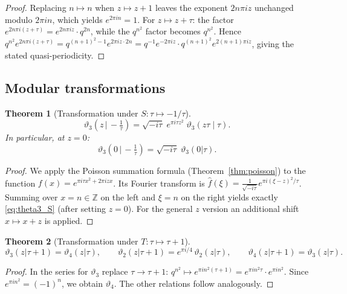 \documentclass[12pt,a4paper]{amsart}
\newtheorem{theorem}{Theorem}[section]
\theoremstyle{definition}
\begin{document}
\begin{proof}
Replacing $n \mapsto n$ when $z \mapsto z+1$ leaves the exponent $2n\pi iz$ unchanged
modulo $2\pi in$, which yields $e^{2\pi in} = 1$.
For $z \mapsto z + \tau$: the factor $e^{2n\pi i(z+\tau)} = e^{2n\pi iz}\cdot q^{2n}$,
while the $q^{n^2}$ factor becomes $q^{n^2}$.  Hence
$q^{n^2} e^{2n\pi i(z+\tau)} = q^{(n+1)^2 - 1} e^{2\pi iz \cdot 2n}
= q^{-1}e^{-2\pi iz} \cdot q^{(n+1)^2} e^{2(n+1)\pi iz}$,
giving the stated quasi-periodicity.
\end{proof}

\subsection{Modular transformations}

\begin{theorem}[Transformation under $S: \tau \mapsto -1/\tau$]\label{thm:S_transform}
\[
  \vartheta_3\!\left(z \,\Big|\, -\tfrac{1}{\tau}\right)
  = \sqrt{-i\tau}\; e^{\pi i \tau z^2}\; \vartheta_3(z\tau \mid \tau).
\]
In particular, at $z = 0$:
\begin{equation}\label{eq:theta3_S}
  \vartheta_3\!\left(0 \,\Big|\, -\tfrac{1}{\tau}\right)
  = \sqrt{-i\tau}\; \vartheta_3(0|\tau).
\end{equation}
\end{theorem}

\begin{proof}
We apply the Poisson summation formula (Theorem~\ref{thm:poisson}) to the function
$f(x) = e^{\pi i\tau x^2 + 2\pi i z x}$.  Its Fourier transform is
$\hat{f}(\xi) = \tfrac{1}{\sqrt{-i\tau}} e^{\pi i(\xi-z)^2/\tau}$.
Summing over $x = n \in \mathbb{Z}$ on the left and $\xi = n$ on the right yields
exactly \eqref{eq:theta3_S} (after setting $z=0$).
For the general $z$ version an additional shift $x \mapsto x + z$ is applied.
\end{proof}

\begin{theorem}[Transformation under $T: \tau \mapsto \tau+1$]\label{thm:T_transform}
\[
  \vartheta_3(z|\tau+1) = \vartheta_4(z|\tau),
  \qquad
  \vartheta_2(z|\tau+1) = e^{\pi i/4}\, \vartheta_2(z|\tau),
  \qquad
  \vartheta_4(z|\tau+1) = \vartheta_3(z|\tau).
\]
\end{theorem}

\begin{proof}
In the series for $\vartheta_3$ replace $\tau \to \tau+1$:
$q^{n^2} \mapsto e^{\pi i n^2(\tau+1)} = e^{\pi i n^2 \tau} \cdot e^{\pi i n^2}$.
Since $e^{\pi i n^2} = (-1)^n$, we obtain $\vartheta_4$.
The other relations follow analogously.
\end{proof}
\end{document}
